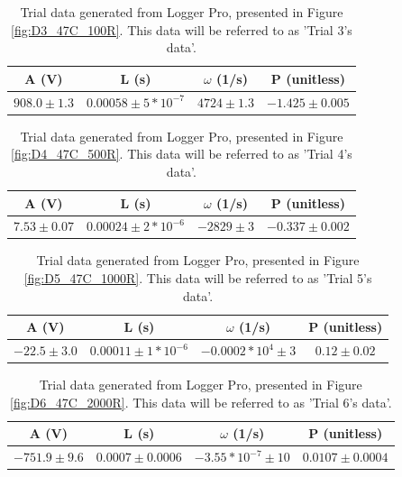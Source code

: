 \documentclass[12pt]{article}
\begin{document}
\begin{table}[h]
\centering
\begin{tabular}{|c|c|c|c|}
\hline
\textbf{A (V)} & \textbf{L (s)} & $\omega$ \textbf{(1/s)} & \textbf{P (unitless)} \\
\hline
$908.0 \pm 1.3$  & $0.00058 \pm 5*10^{-7}$  & $4724 \pm 1.3$ & $-1.425 \pm 0.005$ \\
\hline
\end{tabular}
\caption{Trial data generated from Logger Pro, presented in Figure \ref{fig:D3_47C_100R}. This data will be referred to as 'Trial 3's data'.}
\label{tab:damped_trial_3}
\end{table}

\begin{table}[h]
\centering
\begin{tabular}{|c|c|c|c|}
\hline
\textbf{A (V)} & \textbf{L (s)} & $\omega$ \textbf{(1/s)} & \textbf{P (unitless)} \\
\hline
$7.53 \pm 0.07$  & $0.00024 \pm 2*10^{-6}$  & $-2829 \pm 3$ & $-0.337 \pm 0.002$ \\
\hline
\end{tabular}
\caption{Trial data generated from Logger Pro, presented in Figure \ref{fig:D4_47C_500R}. This data will be referred to as 'Trial 4's data'.}
\label{tab:damped_trial_4}
\end{table}

\begin{table}[h]
\centering
\begin{tabular}{|c|c|c|c|}
\hline
\textbf{A (V)} & \textbf{L (s)} & $\omega$ \textbf{(1/s)} & \textbf{P (unitless)} \\
\hline
$-22.5 \pm 3.0$  & $0.00011 \pm 1*10^{-6}$  & $-0.0002*10^4 \pm 3$ & $0.12 \pm 0.02$ \\
\hline
\end{tabular}
\caption{Trial data generated from Logger Pro, presented in Figure \ref{fig:D5_47C_1000R}. This data will be referred to as 'Trial 5's data'.}
\label{tab:damped_trial_5}
\end{table}

\begin{table}[h]
\centering
\begin{tabular}{|c|c|c|c|}
\hline
\textbf{A (V)} & \textbf{L (s)} & $\omega$ \textbf{(1/s)} & \textbf{P (unitless)} \\
\hline
$-751.9 \pm 9.6$  & $0.0007 \pm 0.0006$  & $-3.55*10^{-7} \pm 10$ & $0.0107 \pm 0.0004$ \\
\hline
\end{tabular}
\caption{Trial data generated from Logger Pro, presented in Figure \ref{fig:D6_47C_2000R}. This data will be referred to as 'Trial 6's data'.}
\label{tab:damped_trial_6}
\end{table}
\end{document}

